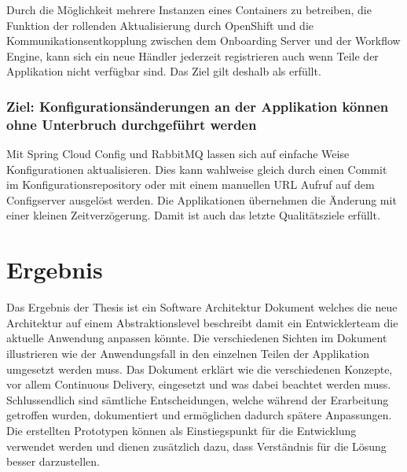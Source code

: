 Durch die Möglichkeit mehrere Instanzen eines Containers zu betreiben, die Funktion der rollenden Aktualisierung durch OpenShift und die Kommunikationsentkopplung zwischen dem Onboarding Server und der Workflow Engine, kann sich ein neue Händler jederzeit registrieren auch wenn Teile
der Applikation nicht verfügbar sind. Das Ziel gilt deshalb als erfüllt.

\subsubsection{Ziel: Konfigurationsänderungen an der Applikation können ohne Unterbruch durchgeführt werden}

Mit Spring Cloud Config und RabbitMQ lassen sich auf einfache Weise Konfigurationen aktualisieren. Dies kann wahlweise gleich durch einen Commit im Konfigurationsrepository oder mit einem manuellen URL Aufruf auf dem Configserver ausgelöst werden. Die Applikationen übernehmen die Änderung mit einer kleinen Zeitverzögerung. Damit ist auch das letzte Qualitätsziele erfüllt.
\newpage
\section{Ergebnis}

Das Ergebnis der Thesis ist ein Software Architektur Dokument welches die neue Architektur auf einem Abstraktionslevel beschreibt damit ein Entwicklerteam die aktuelle Anwendung anpassen könnte. Die verschiedenen Sichten im Dokument illustrieren wie der Anwendungsfall in den einzelnen Teilen der Applikation umgesetzt werden muss. Das Dokument erklärt wie die verschiedenen Konzepte, vor allem Continuous Delivery, eingesetzt und was dabei beachtet werden muss. Schlussendlich sind sämtliche Entscheidungen, welche während der Erarbeitung getroffen wurden, dokumentiert und ermöglichen dadurch spätere Anpassungen.\newline
Die erstellten Prototypen können als Einstiegspunkt für die Entwicklung verwendet werden und dienen zusätzlich dazu, dass Verständnis für die Lösung besser darzustellen.

